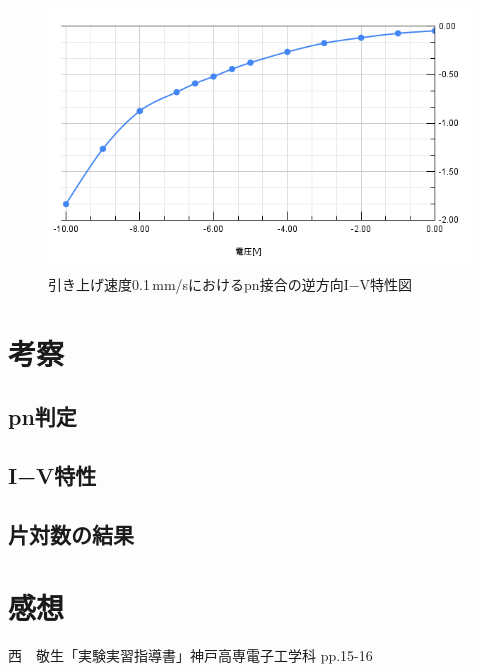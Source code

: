 \documentclass[11pt]{jarticle}
\begin{document}
	\begin{figure}[H]
	\centering
	\includegraphics[width = 12cm]{figs/chart6.png}
	\caption{引き上げ速度0.1\,mm/sにおけるpn接合の逆方向I−V特性図}
	\label{fig:pngyaku0.1}
	\end{figure}

\section{考察}
	\subsection{pn判定}
	\subsection{I−V特性}
	\subsection{片対数の結果}
\section{感想}

\begin{thebibliography}{99}
西　敬生「実験実習指導書」神戸高専電子工学科 pp.15-16
\end{thebibliography}
\end{document}
